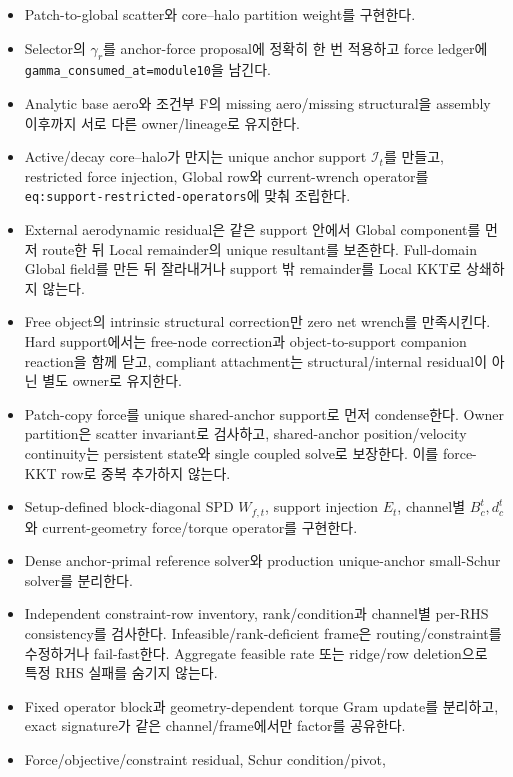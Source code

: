 \documentclass[10pt,a4paper]{article}
\newcommand{\todo}{\textcolor{TodoGray}{\(\square\)}}
\newcommand{\code}[1]{\texttt{#1}}
\begin{document}
\begin{itemize}
  \item[\todo] Patch-to-global scatter와 core--halo partition weight를 구현한다.
  \item[\todo] Selector의 \(\gamma_r\)를 anchor-force proposal에 정확히 한 번 적용하고 force ledger에 \code{gamma\_consumed\_at=module10}을 남긴다.
  \item[\todo] Analytic base aero와 조건부 F의 missing aero/missing structural을 assembly 이후까지 서로 다른 owner/lineage로 유지한다.
  \item[\todo] Active/decay core--halo가 만지는 unique anchor support \(\mathcal I_t\)를 만들고,
  restricted force injection, Global row와 current-wrench operator를
  \code{eq:support-restricted-operators}에 맞춰 조립한다.
  \item[\todo] External aerodynamic residual은 같은 support 안에서 Global component를 먼저 route한 뒤
  Local remainder의 unique resultant를 보존한다. Full-domain Global field를 만든 뒤 잘라내거나
  support 밖 remainder를 Local KKT로 상쇄하지 않는다.
  \item[\todo] Free object의 intrinsic structural correction만 zero net wrench를 만족시킨다.
  Hard support에서는 free-node correction과 object-to-support companion reaction을 함께 닫고,
  compliant attachment는 structural/internal residual이 아닌 별도 owner로 유지한다.
  \item[\todo] Patch-copy force를 unique shared-anchor support로 먼저 condense한다.
  Owner partition은 scatter invariant로 검사하고, shared-anchor position/velocity continuity는
  persistent state와 single coupled solve로 보장한다. 이를 force-KKT row로 중복 추가하지 않는다.
  \item[\todo] Setup-defined block-diagonal SPD \(W_{f,t}\), support injection \(E_t\),
  channel별 \(B_c^t,d_c^t\)와 current-geometry force/torque operator를 구현한다.
  \item[\todo] Dense anchor-primal reference solver와 production unique-anchor small-Schur solver를 분리한다.
  \item[\todo] Independent constraint-row inventory, rank/condition과 channel별 per-RHS consistency를 검사한다.
  Infeasible/rank-deficient frame은 routing/constraint를 수정하거나 fail-fast한다.
  Aggregate feasible rate 또는 ridge/row deletion으로 특정 RHS 실패를 숨기지 않는다.
  \item[\todo] Fixed operator block과 geometry-dependent torque Gram update를 분리하고,
  exact signature가 같은 channel/frame에서만 factor를 공유한다.
  \item[\todo] Force/objective/constraint residual, Schur condition/pivot,

\end{itemize}
\end{document}
